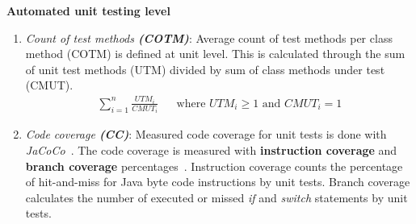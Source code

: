     \begin{addmargin}[0em]{0em}
    \vspace{10px}
    \textbf{Automated unit testing level}
    \vspace{5px}
    \newline
    \begin{enumerate}
    \item \textit{Count of test methods \textbf{(COTM)}}:
    Average count of test methods per class method (COTM) is defined at unit level. This is calculated through the sum
    of unit test methods (UTM) divided by sum of class methods under test (CMUT).
    \begin{align*}
        \sum_{i=1}^{n}\frac{UTM_{i}}{CMUT_{i}} && \text {where } UTM_{i} \geq 1 \text{ and } CMUT_{i} = 1
    \end{align*}
    \item \textit{Code coverage \textbf{(CC)}}:
    Measured code coverage for unit tests is done with \textit{JaCoCo}~\cite{jacoco}. The code coverage is measured with
    \textbf{instruction coverage} and \textbf{branch coverage} percentages~\cite{jacoco-coverage}. Instruction coverage counts the percentage
    of hit-and-miss for Java byte code instructions by unit tests. Branch coverage calculates the number of executed or missed \textit{if}
    and \textit{switch} statements by unit tests.
    \end{enumerate}
    \end{addmargin}

